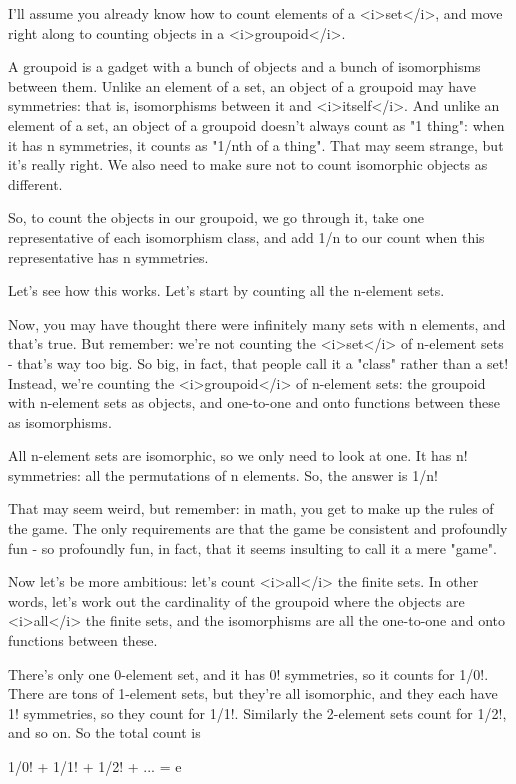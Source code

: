 I'll assume you already know how to count elements of a <i>set</i>,
and move right along to counting objects in a <i>groupoid</i>.

A groupoid is a gadget with a bunch of objects and a bunch of
isomorphisms between them.  Unlike an element of a set, an object of a
groupoid may have symmetries: that is, isomorphisms between it and
<i>itself</i>.  And unlike an element of a set, an object of a
groupoid doesn't always count as "1 thing": when it has n symmetries,
it counts as "1/nth of a thing".  That may seem strange, but it's
really right.  We also need to make sure not to count isomorphic
objects as different.

So, to count the objects in our groupoid, we go through it, take one
representative of each isomorphism class, and add 1/n to our count
when this representative has n symmetries.

Let's see how this works.  Let's start by counting all the n-element sets.

Now, you may have thought there were infinitely many sets with n
elements, and that's true. But remember: we're not counting the
<i>set</i> of n-element sets - that's way too big.  So big, in fact,
that people call it a "class" rather than a set!  Instead, we're
counting the <i>groupoid</i> of n-element sets: the groupoid with
n-element sets as objects, and one-to-one and onto functions between
these as isomorphisms.

All n-element sets are isomorphic, so we only need to look at one.  It
has n! symmetries: all the permutations of n elements.  So, the answer
is 1/n!

That may seem weird, but remember: in math, you get to make up the
rules of the game.  The only requirements are that the game be
consistent and profoundly fun - so profoundly fun, in fact, that it
seems insulting to call it a mere "game".

Now let's be more ambitious: let's count <i>all</i> the finite sets.
In other words, let's work out the cardinality of the groupoid where
the objects are <i>all</i> the finite sets, and the isomorphisms are
all the one-to-one and onto functions between these.

There's only one 0-element set, and it has 0! symmetries, so it counts
for 1/0!.  There are tons of 1-element sets, but they're all
isomorphic, and they each have 1! symmetries, so they count for 1/1!.
Similarly the 2-element sets count for 1/2!, and so on.  So the total
count is

1/0! + 1/1! + 1/2! + ... = e

